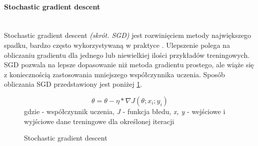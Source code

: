 \paragraph{Stochastic gradient descent} \mbox{}\\
Stochastic gradient descent \textit{(skrót. SGD)} jest rozwinięciem metody największego spadku,
bardzo często wykorzystywaną w praktyce \cite{OptimizersOverview}.
Ulepszenie polega na obliczaniu gradientu dla jednego lub niewielkiej ilości przykładów
treningowych. SGD pozwala na lepsze dopasowanie
niż metoda gradientu prostego, ale wiąże się z koniecznością zastosowania mniejszego
współczynnika uczenia. Sposób obliczania SGD przedstawiony jest poniżej \ref{eq:sgd}.
\begin{figure}[h!]
\renewcommand{\figurename}{Wzór}%
\begin{equation*}
\theta = \theta - \eta * \nabla J(\theta; x_i; y_i)
\end{equation*}
\centering
gdzie \texteta - współczynnik uczenia, \textit{J} - funkcja błedu,
\textit{x, y} - wejściowe i wyjściowe dane treningowe dla określonej iteracji
\caption{Stochastic gradient descent}
\label{eq:sgd}
\end{figure}

